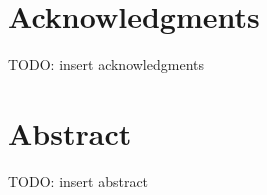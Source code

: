 
\chapter*{Acknowledgments}

TODO: insert acknowledgments

\clearpage


\chapter*{Abstract}

TODO: insert abstract

\clearpage


\tableofcontents

\listoffigures

\clearpage


